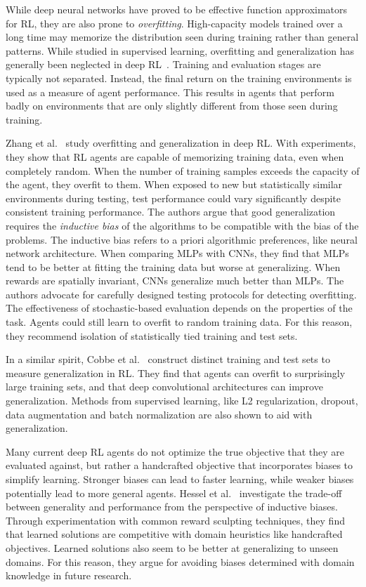 While deep neural networks have proved to be effective function approximators for RL, they are also prone to \textit{overfitting}.
High-capacity models trained over a long time may memorize the distribution seen during training rather than general patterns.
While studied in supervised learning, overfitting and generalization has generally been neglected in deep RL~\cite{kirk_survey_2022}.
Training and evaluation stages are typically not separated.
Instead, the final return on the training environments is used as a measure of agent performance.
This results in agents that perform badly on environments that are only slightly different from those seen during training.

Zhang et al.~\cite{zhang_study_2018} study overfitting and generalization in deep RL.
With experiments, they show that RL agents are capable of memorizing training data, even when completely random.
When the number of training samples exceeds the capacity of the agent, they overfit to them.
When exposed to new but statistically similar environments during testing, test performance could vary significantly despite consistent training performance.
The authors argue that good generalization requires the \textit{inductive bias} of the algorithms to be compatible with the bias of the problems.
The inductive bias refers to a priori algorithmic preferences, like neural network architecture.
When comparing MLPs with CNNs, they find that MLPs tend to be better at fitting the training data but worse at generalizing.
When rewards are spatially invariant, CNNs generalize much better than MLPs.
The authors advocate for carefully designed testing protocols for detecting overfitting.
The effectiveness of stochastic-based evaluation depends on the properties of the task.
Agents could still learn to overfit to random training data. 
For this reason, they recommend isolation of statistically tied training and test sets.

In a similar spirit, Cobbe et al.~\cite{cobbe_quantifying_2019} construct distinct training and test sets to measure generalization in RL.
They find that agents can overfit to surprisingly large training sets, and that deep convolutional architectures can improve generalization.
Methods from supervised learning, like L2 regularization, dropout, data augmentation and batch normalization are also shown to aid with generalization.

Many current deep RL agents do not optimize the true objective that they are evaluated against,
but rather a handcrafted objective that incorporates biases to simplify learning.
Stronger biases can lead to faster learning, while weaker biases potentially lead to more general agents.
Hessel et al.~\cite{hessel_inductive_2019} investigate the trade-off between generality and performance from the perspective of inductive biases.
Through experimentation with common reward sculpting techniques, they find that learned solutions are competitive with domain heuristics like handcrafted objectives.
Learned solutions also seem to be better at generalizing to unseen domains.
For this reason, they argue for avoiding biases determined with domain knowledge in future research.

